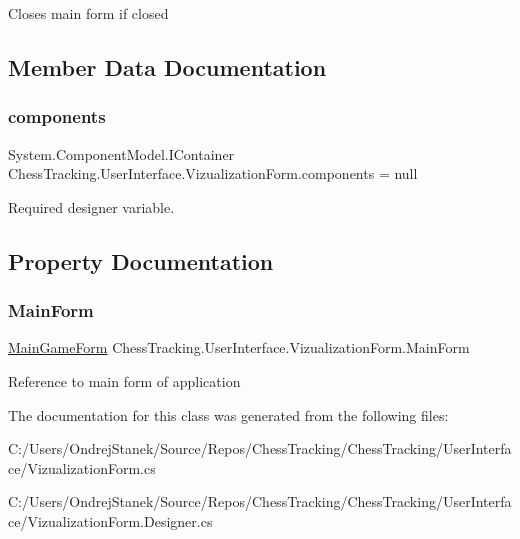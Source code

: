 Closes main form if closed 



\subsection{Member Data Documentation}
\mbox{\label{class_chess_tracking_1_1_user_interface_1_1_vizualization_form_a3ad0b7b18e0dc1a221aa768e738b5a4b}} 
\subsubsection{\texorpdfstring{components}{components}}
{\footnotesize\ttfamily System.\+Component\+Model.\+I\+Container Chess\+Tracking.\+User\+Interface.\+Vizualization\+Form.\+components = null\hspace{0.3cm}{\ttfamily [private]}}



Required designer variable. 



\subsection{Property Documentation}
\mbox{\label{class_chess_tracking_1_1_user_interface_1_1_vizualization_form_a3899ab06031df2d5b799662376c7dc56}} 
\subsubsection{\texorpdfstring{MainForm}{MainForm}}
{\footnotesize\ttfamily \mbox{\hyperlink{class_chess_tracking_1_1_user_interface_1_1_main_game_form}{Main\+Game\+Form}} Chess\+Tracking.\+User\+Interface.\+Vizualization\+Form.\+Main\+Form\hspace{0.3cm}{\ttfamily [get]}}



Reference to main form of application 



The documentation for this class was generated from the following files\+:\begin{DoxyCompactItemize}
\item 
C\+:/\+Users/\+Ondrej\+Stanek/\+Source/\+Repos/\+Chess\+Tracking/\+Chess\+Tracking/\+User\+Interface/Vizualization\+Form.\+cs\item 
C\+:/\+Users/\+Ondrej\+Stanek/\+Source/\+Repos/\+Chess\+Tracking/\+Chess\+Tracking/\+User\+Interface/Vizualization\+Form.\+Designer.\+cs\end{DoxyCompactItemize}
